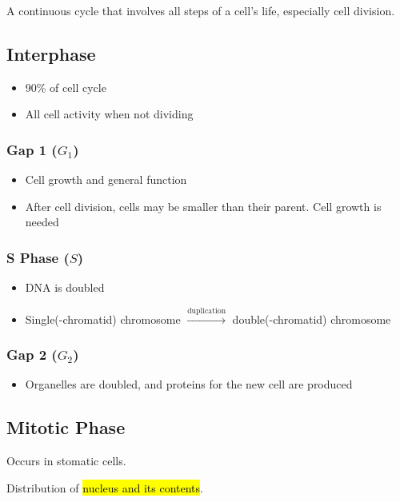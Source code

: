 \documentclass[a4paper,12pt]{article}
\begin{document}
A continuous cycle that involves all steps of a cell's life, especially cell division.

\subsection{Interphase}

\begin{itemize}
    \item{90\% of cell cycle}
    \item{All cell activity when not dividing}
\end{itemize}

\subsubsection{Gap 1 ($G_1$)}
\begin{itemize}
    \item{Cell growth and general function}
    \item{After cell division, cells may be smaller than their parent. Cell growth is needed}
\end{itemize}

\subsubsection{S Phase ($S$)}
\begin{itemize}
    \item{DNA is doubled}
    \item{Single(-chromatid) chromosome $\xrightarrow{\textrm{duplication}}$ double(-chromatid) chromosome}
\end{itemize}

\subsubsection{Gap 2 ($G_2$)}
\begin{itemize}
    \item{Organelles are doubled, and proteins for the new cell are produced}
\end{itemize}

\subsection{Mitotic Phase}\noindent

Occurs in stomatic cells.

Distribution of \hl{nucleus and its contents}.
\end{document}
